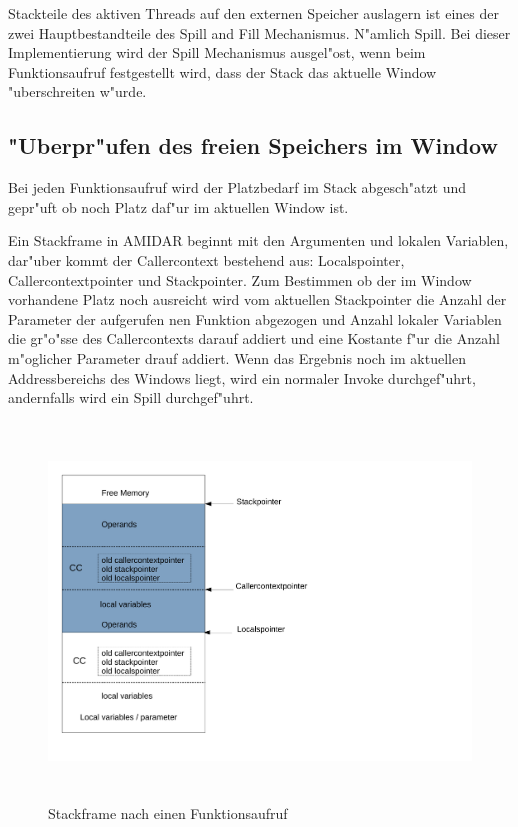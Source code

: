 Stackteile des aktiven Threads auf den externen Speicher auslagern ist eines der zwei Hauptbestandteile des Spill and Fill Mechanismus. N"amlich Spill. Bei dieser Implementierung wird der Spill Mechanismus ausgel"ost, wenn beim Funktionsaufruf festgestellt wird, dass der Stack das aktuelle Window "uberschreiten w"urde.

\subsection{"Uberpr"ufen des freien Speichers im Window}
Bei jeden Funktionsaufruf wird der Platzbedarf im Stack abgesch"atzt und gepr"uft ob noch Platz daf"ur im aktuellen Window ist. 

Ein Stackframe in AMIDAR beginnt mit den Argumenten und lokalen Variablen, dar"uber kommt der Callercontext bestehend aus: Localspointer, Callercontextpointer und Stackpointer. Zum Bestimmen ob der im Window vorhandene Platz noch ausreicht wird vom aktuellen Stackpointer die Anzahl der Parameter der aufgerufen nen Funktion abgezogen und Anzahl lokaler Variablen die gr"o{"ss}e des Callercontexts darauf addiert und eine Kostante f"ur die Anzahl m"oglicher Parameter drauf addiert. Wenn das Ergebnis noch im aktuellen Addressbereichs des Windows liegt, wird ein normaler Invoke durchgef"uhrt, andernfalls wird ein Spill durchgef"uhrt. 

\begin{figure}
	\centering
	\includegraphics[height = 10cm]{PS_RS_graphics/StackframeafterInvoke.pdf}
	\caption{Stackframe nach einen Funktionsaufruf}
\end{figure}

